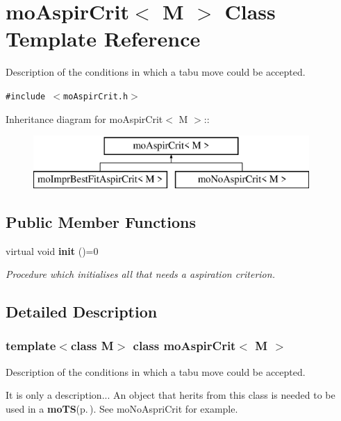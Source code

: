 \section{mo\-Aspir\-Crit$<$ M $>$ Class Template Reference}
\label{classmo_aspir_crit}
Description of the conditions in which a tabu move could be accepted.  


{\tt \#include $<$mo\-Aspir\-Crit.h$>$}

Inheritance diagram for mo\-Aspir\-Crit$<$ M $>$::\begin{figure}[H]
\begin{center}
\leavevmode
\includegraphics[height=2cm]{classmo_aspir_crit}
\end{center}
\end{figure}
\subsection*{Public Member Functions}
\begin{CompactItemize}
\item 
virtual void {\bf init} ()=0
\begin{CompactList}\small\item\em Procedure which initialises all that needs a aspiration criterion. \item\end{CompactList}\end{CompactItemize}


\subsection{Detailed Description}
\subsubsection*{template$<$class M$>$ class mo\-Aspir\-Crit$<$ M $>$}

Description of the conditions in which a tabu move could be accepted. 

It is only a description... An object that herits from this class is needed to be used in a {\bf mo\-TS}{\rm (p.\,\pageref{classmo_t_s})}. See mo\-No\-Aspri\-Crit for example. 




